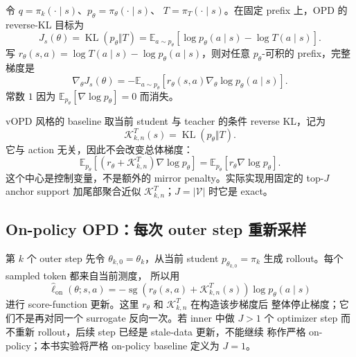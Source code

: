 令 $q=\pi_k(\cdot\mid s)$、$p_\theta=\pi_\theta(\cdot\mid s)$、
$T=\pi_T(\cdot\mid s)$。在固定 prefix 上，OPD 的 reverse-KL 目标为
\begin{equation}
\label{eq:ch2-opd-baseline-objective}
J_s(\theta)=\operatorname{KL}(p_\theta\Vert T)
 =\mathbb E_{a\sim p_\theta}
 \left[\log p_\theta(a\mid s)-\log T(a\mid s)\right].
\end{equation}
写 $r_\theta(s,a)=\log T(a\mid s)-\log p_\theta(a\mid s)$，则对任意
$p_\theta$-可积的 prefix，完整梯度是
\begin{equation}
\label{eq:ch2-opd-baseline-gradient}
\nabla_\theta J_s(\theta)
 =-\mathbb E_{a\sim p_\theta}
 \left[r_\theta(s,a)\nabla_\theta\log p_\theta(a\mid s)\right].
\end{equation}
常数 $1$ 因为 $\mathbb E_{p_\theta}[\nabla\log p_\theta]=0$ 而消失。

vOPD 风格的 baseline 取当前 student 与 teacher 的条件 reverse KL，记为
\begin{equation}
\label{eq:ch2-opd-vopd-center}
 \mathcal K_{k,n}^{T}(s)=\operatorname{KL}(p_\theta\Vert T).
\end{equation}
它与 action 无关，因此不会改变总体梯度：
\begin{equation}
\mathbb E_{p_\theta}[(r_\theta+\mathcal K_{k,n}^{T})\nabla\log p_\theta]
 =\mathbb E_{p_\theta}[r_\theta\nabla\log p_\theta].
\end{equation}
这个中心是控制变量，不是额外的 mirror penalty。实际实现用固定的 top-$J$
anchor support 加尾部聚合近似 $\mathcal K_{k,n}^{T}$；$J=|\mathcal V|$ 时它是 exact。

\subsection{On-policy OPD：每次 outer step 重新采样}
\label{subsec:ch2-opd-onpolicy-baseline}

第 $k$ 个 outer step 先令 $\theta_{k,0}=\theta_k$，从当前 student
$p_{\theta_{k,0}}=\pi_k$ 生成 rollout。每个 sampled token 都来自当前测度，
所以用
\begin{equation}
\widehat\ell_{\mathrm{on}}(\theta;s,a)
 =-\operatorname{sg}\!\left(r_\theta(s,a)+\mathcal K_{k,n}^{T}(s)\right)
 \log p_\theta(a\mid s)
\end{equation}
进行 score-function 更新。这里 $r_\theta$ 和 $\mathcal K_{k,n}^{T}$ 在构造该步梯度后
整体停止梯度；它们不是再对同一个 surrogate 反向一次。若 inner 中做 $J>1$
个 optimizer step 而不重新 rollout，后续 step 已经是 stale-data 更新，不能继续
称作严格 on-policy；本书实验将严格 on-policy baseline 定义为 $J=1$。


